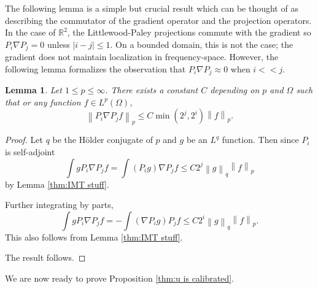 \documentclass[11pt]{amsart}
\newtheorem{lemma}[theorem]{Lemma}
\theoremstyle{remark}
\theoremstyle{definition}
\newcommand{\R}{\mathbb{R}}
\newcommand{\norm}[1]{\left\lVert#1\right\rVert}
\newcommand{\grad}{\nabla}
\begin{document}
The following lemma is a simple but crucial result which can be thought of as describing the commutator of the gradient operator and the projection operators.  In the case of $\R^2$, the Littlewood-Paley projections commute with the gradient so $P_i \grad P_j = 0$ unless $|i-j|\leq 1$.  On a bounded domain, this is not the case; the gradient does not maintain localization in frequency-space.  However, the following lemma formalizes the observation that $P_i \grad P_j \approx 0$ when $i << j$.  

\begin{lemma} \label{thm:grad and proj}
Let $1 \leq p \leq \infty$.  There exists a constant $C$ depending on $p$ and $\Omega$ such that or any function $f \in L^p(\Omega)$,
\[ \norm{P_i \grad P_j f}_p \leq C \min(2^j,2^i) \norm{f}_p. \]
\end{lemma}
\begin{proof}
Let $q$ be the H\"{o}lder conjugate of $p$ and $g$ be an $L^q$ function.  Then since $P_i$ is self-adjoint
\[ \int g P_i \grad P_j f = \int (P_i g) \grad P_j f \leq C 2^j \norm{g}_q \norm{f}_p \]
by Lemma \ref{thm:IMT stuff}.  

Further integrating by parts,
\[ \int g P_i \grad P_j f = - \int (\grad P_i g) P_j f \leq C 2^i \norm{g}_q \norm{f}_p. \]
This also follows from Lemma \ref{thm:IMT stuff}.  

The result follows.  
\end{proof}

We are now ready to prove Proposition \ref{thm:u is calibrated}.  
\end{document}
